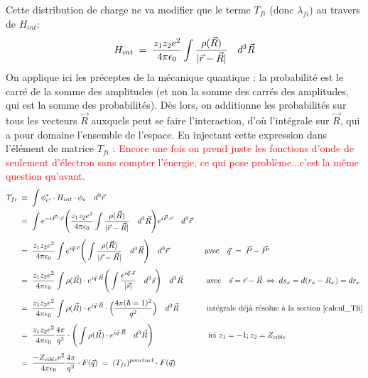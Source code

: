 Cette distribution de charge ne va modifier que le terme $T_{fi}$ (donc $\lambda_{fi}$) au travers de $H_{int}$:
$$H_{int} \; = \; \dfrac{z_1z_2e^2}{4\pi\epsilon_0} \int \dfrac{\rho(\vec{R})}{|\vec{r} - \vec{R}|} \quad d^3\vec{R}$$ On applique ici les préceptes de la mécanique quantique : la probabilité est le carré de la somme des amplitudes (et non la somme des carrés des amplitudes, qui est la somme des probabilités). Dès lors, on additionne les probabilités sur tous les vecteurs $\vec{R}$ auxquels peut se faire l'interaction, d'où l'intégrale sur $\vec{R}$, qui a pour domaine l'ensemble de l'espace. En injectant cette expression dans l'élément de matrice $T_{fi}$ : \textcolor{red}{Encore une fois on prend juste les fonctions d'onde de seulement d'électron sans compter l'énergie, ce qui pose problème...c'est la même question qu'avant.}
\begin{align*}
    T_{fi} 
&\; \equiv \;
    \int \phi^*_{e'} \cdot H_{int} \cdot \phi_e \quad d^3\vec{r}\\
&\; = \; 
    \int 
    e^{-i\vec{P'} \cdot\vec{r}}
    \Bigg(
        \dfrac{z_1z_2e^2}{4\pi\epsilon_0} \int \dfrac{\rho(\vec{R})}{|\vec{r} - \vec{R}|} \quad d^3\vec{R}
    \Bigg)
    e^{i\vec{P} \cdot\vec{r}}
    \quad d^3\vec{r}\\[4pt]
& \; = \; 
    \dfrac{z_1z_2e^2}{4\pi\epsilon_0} \int 
    e^{i\vec{q} \cdot\vec{r}}
    \Bigg(
         \int \dfrac{\rho(\vec{R})}{|\vec{r} - \vec{R}|} \quad d^3\vec{R}
    \Bigg)
    \quad d^3\vec{r}
    \qquad \qquad \;\; \text{avec} \quad \vec{q} \; = \; \vec{P}-\vec{P'}
    \\[4pt]
& \; = \; 
    \dfrac{z_1z_2e^2}{4\pi\epsilon_0} \int 
    \rho(\vec{R}) \cdot e^{i\vec{q} \cdot\vec{R}}
    \Bigg(
         \int \dfrac{ e^{i\vec{q} \cdot\vec{s}}   }{|\vec{s}|} \quad d^3\vec{s}
    \Bigg)
    \quad d^3\vec{R}
    \qquad \quad \text{avec} \quad \vec{s} = \vec{r}-\vec{R} \; \Leftrightarrow \; ds_x = d(r_x - R_x) = dr_x
    \\[4pt]
& \; = \; 
    \dfrac{z_1z_2e^2}{4\pi\epsilon_0} \int 
    \rho(\vec{R}) \cdot e^{i\vec{q} \cdot\vec{R}}
    \cdot \Big( \dfrac{4\pi(\hbar = 1)^2}{q^2} \Big)
    \quad d^3\vec{R}
    \qquad \quad \;\; \text{intégrale déjà résolue à la section \eqref{calcul_Tfi}}
    \\[4pt]
& \; = \; 
    \dfrac{z_1z_2e^2}{4\pi\epsilon_0} \dfrac{4\pi}{q^2} \cdot
    \Bigg(
    \int 
    \rho(\vec{R}) \cdot e^{i\vec{q} \cdot\vec{R}}
    \quad d^3\vec{R}
    \Bigg)
    \qquad \qquad \qquad \quad \text{ici  }  z_1 = -1; z_2 = Z_{cible}
    \\[4pt]
& \; = \; 
    \dfrac{-Z_{cible}e^2}{4\pi\epsilon_0} \dfrac{4\pi}{q^2}
    \cdot F(\vec{q})
    \; = \;
    (T_{fi})^{ponctuel} \cdot F(\vec{q})
    \\
\end{align*}
